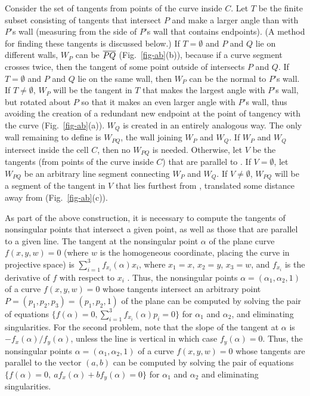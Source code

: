 Consider the set of tangents from points of the curve inside $C$.
Let $T$ be the finite subset consisting of tangents that intersect $P$
and make a larger angle than  with $P$'s wall 
(measuring from the side of $P$'s wall that contains endpoints).
(A method for finding these tangents is discussed below.)
If $T = \emptyset$ and $P$ and $Q$ lie on different walls,
$W_{P}$ can be $\mbox{$\overline{PQ}$}$ (Fig.~\ref{fig-ab}(b)), 
because if a curve segment crosses  
twice, then the tangent of some point outside of  intersects $P$ 
and $Q$.
If $T = \emptyset$ and $P$ and $Q$ lie on the same wall, 
then $W_{P}$ can be the normal to $P$'s wall.
If $T \neq \emptyset$, $W_{P}$ will be
the tangent in $T$ that makes the largest angle with $P$'s wall,
but rotated about $P$ so that
it makes an even larger angle with $P$'s wall, thus avoiding the creation 
of a redundant
new endpoint at the point of tangency with the curve (Fig.~\ref{fig-ab}(a)).
$W_{Q}$ is created in an entirely analogous way.
The only wall remaining to define is $W_{PQ}$, the wall joining $W_{P}$ 
and $W_{Q}$.
If $W_{P}$ and $W_{Q}$ intersect inside the cell $C$, then no $W_{PQ}$ 
is needed.
Otherwise, let $V$ be the tangents (from points of the curve inside $C$) 
that are
parallel to .
If $V = \emptyset$, let $W_{PQ}$ be an arbitrary line segment 
connecting $W_{P}$
and $W_{Q}$.
If $V \neq \emptyset$, $W_{PQ}$ will be a segment of the tangent in $V$ 
that lies furthest from , translated some distance away 
from 
(Fig.~\ref{fig-ab}(c)).


As part of the above construction, it is necessary to compute the tangents 
of nonsingular
points that intersect a given point, as well as those that are parallel to 
a given line.
The tangent at the nonsingular point $\alpha$ of the plane
curve \mbox{$f(x,y,w)=0$} (where $w$ is the homogeneous coordinate, 
placing the curve in
projective space) is $\sum_{i=1}^{3} f_{x_{i}}(\alpha) x_{i}$, 
where $x_{1} = x$,
$x_{2} = y$, $x_{3} = w$, and $f_{x_{i}}$ is the derivative of $f$ with 
respect to $x_{i}$
\cite{walker}.
Thus, the nonsingular points $\alpha = (\alpha_{1}, \alpha_{2}, 1)$ of 
a curve 
\mbox{$f(x,y,w)=0$}
whose tangents intersect an arbitrary point $P = (p_{1},p_{2},p_{3}) = 
(p_{1},p_{2},1)$
of the plane can be computed by solving the pair of equations 
$\{f(\alpha) = 0, \sum_{i=1}^{3} f_{x_{i}}(\alpha) p_{i} = 0 \}$ 
for $\alpha_{1}$ and $\alpha_{2}$, and eliminating singularities.
For the second problem, note that the slope of the tangent at $\alpha$ is 
$-f_{x}(\alpha) / f_{y}(\alpha)$, unless the line is vertical in which case 
$f_{y}(\alpha) = 0$.
Thus, the nonsingular points $\alpha = (\alpha_{1}, \alpha_{2}, 1)$ of a 
curve $f(x,y,w)=0$
whose tangents are parallel to the vector $(a,b)$
can be computed by solving the pair of equations 
$\{f(\alpha) = 0,\ a f_{x}(\alpha) + b f_{y}(\alpha) = 0 \}$ 
for $\alpha_{1}$ and $\alpha_{2}$ and eliminating singularities.

